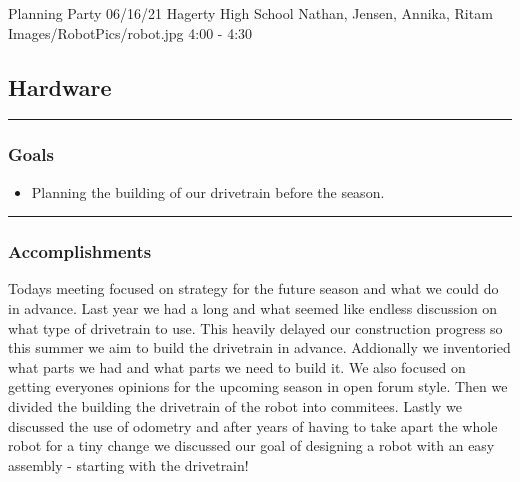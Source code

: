 \insertmeeting 
	{Planning Party} 
	{06/16/21}
	{Hagerty High School}
	{Nathan, Jensen, Annika, Ritam}
	{Images/RobotPics/robot.jpg}
	{4:00 - 4:30}
	
\subsection*{Hardware}
\noindent\hfil\rule{\textwidth}{.4pt}\hfil
\subsubsection*{Goals}
\begin{itemize}
    \item Planning the building of our drivetrain before the season.

\end{itemize} 

\noindent\hfil\rule{\textwidth}{.4pt}\hfil

\subsubsection*{Accomplishments}
Todays meeting focused on strategy for the future season and what we could do in advance. Last year we had a long and what seemed like endless discussion on what type of drivetrain to use. This heavily delayed our construction progress so this summer we aim to build the drivetrain in advance. Addionally we inventoried what parts we had and what parts we need to build it. We also focused on getting everyones opinions for the upcoming season in open forum style. Then we divided the building the drivetrain of the robot into commitees. Lastly we discussed the use of odometry and after years of having to take apart the whole robot for a tiny change we discussed our goal of designing a robot with an easy assembly - starting with the drivetrain!







